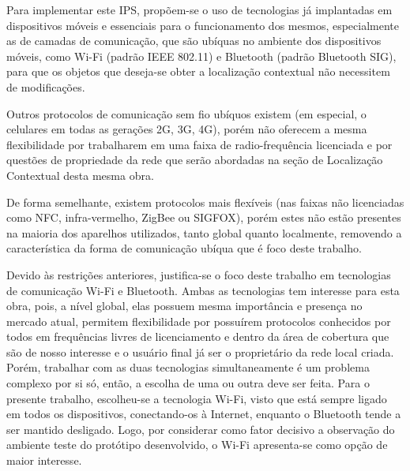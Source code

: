 Para implementar este IPS, propõem-se o uso de tecnologias já implantadas em
dispositivos móveis e essenciais para o funcionamento dos mesmos, especialmente
as de camadas de comunicação, que são ubíquas no ambiente dos dispositivos
móveis, como Wi-Fi (padrão IEEE 802.11) e Bluetooth
(padrão Bluetooth SIG), para que os objetos que deseja-se obter a localização
contextual não necessitem de modificações.

Outros protocolos de comunicação sem fio ubíquos existem (em especial, o
celulares em todas as gerações 2G, 3G, 4G), porém não oferecem a mesma
flexibilidade por trabalharem em uma faixa de radio-frequência licenciada e por
questões de propriedade da rede que serão abordadas na seção de Localização
Contextual desta mesma obra.

De forma semelhante, existem protocolos mais flexíveis (nas faixas não
licenciadas como NFC, infra-vermelho, ZigBee ou
SIGFOX), porém estes não estão presentes na maioria dos aparelhos
utilizados, tanto global quanto localmente, removendo a característica da
forma de comunicação ubíqua que é foco deste trabalho.

Devido às restrições anteriores, justifica-se o foco deste trabalho em tecnologias de
comunicação Wi-Fi e Bluetooth. Ambas as tecnologias
tem interesse para esta obra, pois, a nível global, elas possuem mesma importância e presença no mercado atual, permitem
flexibilidade por possuírem protocolos conhecidos por todos em frequências
livres de licenciamento e dentro da área de cobertura que são de nosso interesse
e o usuário final já ser o proprietário da rede local criada. Porém, trabalhar com as duas
tecnologias simultaneamente é um problema complexo por si só, então, a escolha
de uma ou outra deve ser feita. Para o presente trabalho, escolheu-se a tecnologia Wi-Fi, visto que está sempre
ligado em todos os dispositivos, conectando-os à Internet, enquanto o Bluetooth tende
a ser mantido desligado. Logo, por considerar como fator decisivo a observação do ambiente teste do protótipo
desenvolvido, o Wi-Fi apresenta-se como opção de maior interesse.
